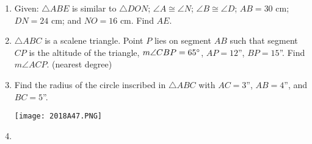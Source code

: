 \documentclass[../uilmath.tex]{subfiles}
\begin{document}
\begin{enumerate}[label=\bfseries\arabic*.]
    \item %
    Given: $\triangle ABE$ is similar to $\triangle DON$; $\angle A \cong \angle N$; $\angle B\cong \angle D$; $AB=30$ cm; $DN=24$ cm; and $NO=16$ cm. Find $AE$.

    \item %
    $\triangle ABC$ is a scalene triangle. Point $P$ lies on segment $AB$ such that segment $CP$ is the altitude of the triangle, $m\angle CBP=65\degree$, $AP=12$'', $BP=15$''. Find $m\angle ACP$. (nearest degree)

    \item %
    Find the radius of the circle inscribed in $\triangle ABC$ with $AC=3$'', $AB=4$'', and $BC=5$''.
    \begin{center}
        \texttt{[image: 2018A47.PNG]}
    \end{center}

    \item %
    
\end{enumerate}
\end{document}

